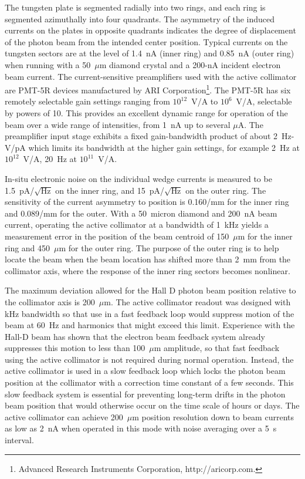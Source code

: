 The tungsten plate is segmented radially into two rings, and each ring is
segmented azimuthally into four quadrants. The asymmetry of the induced 
currents on the plates in opposite quadrants indicates the degree of
displacement of the photon beam from the intended center position. Typical
currents on the tungsten sectors are at the level of 1.4~nA (inner ring)
and 0.85~nA (outer ring) when running with a 50~$\mu$m diamond crystal
and a 200-nA incident electron beam current. The current-sensitive preamplifiers
used with the active collimator are PMT-5R devices manufactured by
ARI Corporation\footnote{Advanced Research Instruments Corporation, http://aricorp.com.}. The PMT-5R has six remotely selectable gain settings
ranging from $10^{12}$~V/A to $10^6$~V/A, selectable by powers of 10.
This provides an excellent dynamic
range for operation of the beam over a wide range of intensities, from
1~nA up to several $\mu$A. The preamplifier input stage exhibits a fixed
gain-bandwidth product of about 2~Hz-V/pA which limits its bandwidth at
the higher gain settings, for example 2~Hz at $10^{12}$~V/A, 20~Hz at
$10^{11}$~V/A.

In-situ electronic noise on the individual wedge currents is measured to
be 1.5~pA/$\sqrt{\mbox{Hz}}$ on the inner ring, and 15~pA/$\sqrt{\mbox{Hz}}$
on the outer ring. The sensitivity of the current asymmetry to position is
0.160/mm for the inner ring and 0.089/mm for the outer. 
With a 50~micron diamond and 200~nA beam current, operating the active
collimator at a bandwidth of 1~kHz yields a measurement error in the
position of the beam centroid of 150~$\mu$m for the inner ring and
450~$\mu$m for the outer ring.
The purpose of the outer ring is to help locate the beam when the beam location
has shifted more than 2~mm from the collimator axis, where the response
of the inner ring sectors becomes nonlinear.

The maximum deviation allowed for the Hall D photon beam position 
relative to the collimator axis is 200~$\mu$m. The active collimator
readout was designed with kHz bandwidth so that use in a
fast feedback loop would suppress motion of the beam at 60~Hz and harmonics
that might exceed this limit. Experience with the Hall-D beam has shown
that the electron beam feedback system already suppresses this motion
to less than 100~$\mu$m amplitude, so that fast feedback using the active
collimator is not required during normal operation. Instead, the active collimator is
used in a slow feedback loop which locks the photon beam position at
the collimator with a correction time constant of a few seconds. This
slow feedback system
is essential for preventing long-term drifts in the photon beam
position that would otherwise occur on the time scale of hours or
days. The active collimator can achieve 200~$\mu$m position resolution down to beam currents as low as 2~nA when operated in this mode with noise averaging over a 5~s interval.


